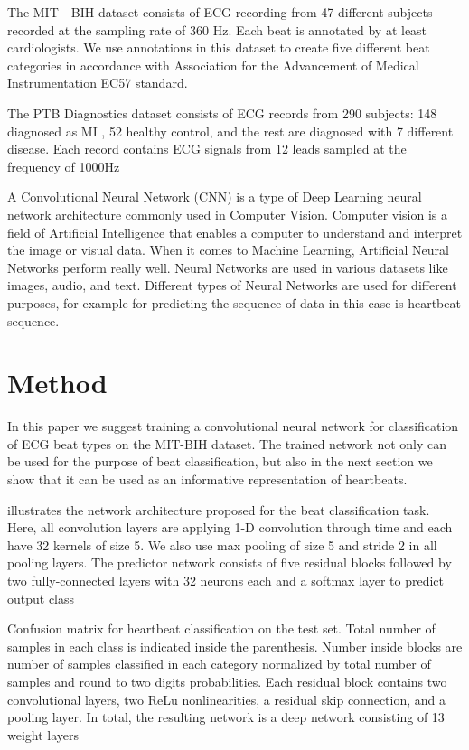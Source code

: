 \documentclass[twocolumn]{article}
\begin{document}
The MIT - BIH dataset consists of ECG recording from 47 different subjects recorded at the sampling rate of 360 Hz. Each beat is annotated by at least cardiologists. We use annotations in this dataset to create five different beat categories in accordance with Association for the Advancement of Medical Instrumentation EC57 standard.

The PTB Diagnostics dataset consists of ECG records from 290 subjects: 148 diagnosed as MI , 52 healthy control, and the rest are diagnosed with 7 different disease. Each record contains ECG signals from 12 leads sampled at the frequency of 1000Hz

A Convolutional Neural Network (CNN) is a type of Deep Learning neural network architecture commonly used in Computer Vision. Computer vision is a field of Artificial Intelligence that enables a computer to understand and interpret the image or visual data. 
When it comes to Machine Learning, Artificial Neural Networks perform really well. Neural Networks are used in various datasets like images, audio, and text. Different types of Neural Networks are used for different purposes, for example for predicting the sequence of data in this case is heartbeat sequence.
\section{Method}
In this paper we suggest training a convolutional neural network for classification of ECG beat types on the MIT-BIH dataset. The trained network not only can be used for the purpose of beat classification, but also in the next section we show that it can be used as an informative representation of heartbeats.

illustrates the network architecture proposed for the beat classification task. Here, all convolution layers are applying 1-D convolution through time and each have 32 kernels of size 5. We also use max pooling of size 5 and stride 2 in all pooling layers. The predictor network consists of five residual blocks followed by two fully-connected layers with 32 neurons each and a softmax layer to predict output class

Confusion matrix for heartbeat classification on the test set. Total number of samples in each class is indicated inside the parenthesis. Number inside blocks are number of samples classified in each category normalized by total number of samples and round to two digits probabilities. Each residual block contains two convolutional layers, two ReLu nonlinearities, a residual skip connection, and a pooling layer. In total, the resulting network is a deep network consisting of 13 weight layers
\end{document}
